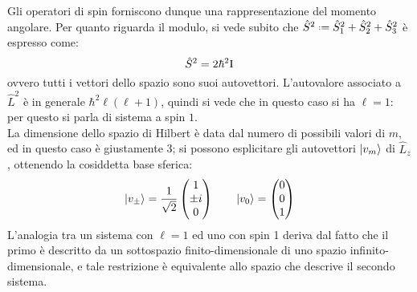 Gli operatori di spin forniscono dunque una rappresentazione del momento angolare. Per quanto riguarda il modulo, si vede subito che $ \hat{S}^2 \defeq \hat{S}_1^2 + \hat{S}_2^2 + \hat{S}_3^2 $ è espresso come:
\begin{equation}
	\hat{S}^2 = 2\hbar^2 \mathbf{\text{I}}
	\label{eq:2.43}
\end{equation}
ovvero tutti i vettori dello spazio sono suoi autovettori. L'autovalore associato a $ \hat{L}^2 $ è in generale $ \hbar^2 \ell (\ell + 1) $, quindi si vede che in questo caso si ha $ \ell = 1 $: per questo si parla di sistema a spin $ 1 $.\\
La dimensione dello spazio di Hilbert è data dal numero di possibili valori di $ m $, ed in questo caso è giustamente 3; si possono esplicitare gli autovettori $ \ket{v_m} $ di $ \hat{L}_z $, ottenendo la cosiddetta base sferica:
\begin{equation}
	\ket{v_{\pm}} = \frac{1}{\sqrt{2}}
	\begin{pmatrix}
		1 \\ \pm i \\ 0
	\end{pmatrix}
	\qquad
	\ket{v_0} =
	\begin{pmatrix}
		0 \\ 0 \\ 1
	\end{pmatrix}
	\label{eq:2.44}
\end{equation}
L'analogia tra un sistema con $ \ell = 1 $ ed uno con spin 1 deriva dal fatto che il primo è descritto da un sottospazio finito-dimensionale di uno spazio infinito-dimensionale, e tale restrizione è equivalente allo spazio che descrive il secondo sistema.










